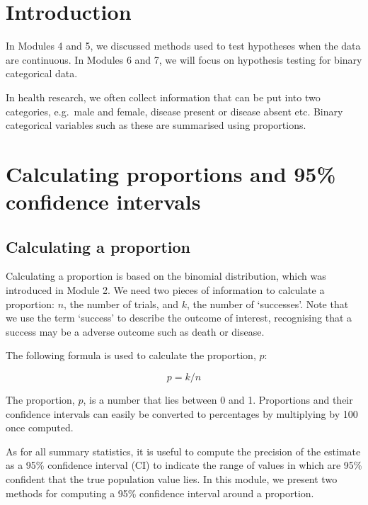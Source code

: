 \documentclass[
]{memoir}
\begin{document}
\hypertarget{introduction-4}{%
\section{Introduction}\label{introduction-4}}

In Modules 4 and 5, we discussed methods used to test hypotheses when the data are continuous. In Modules 6 and 7, we will focus on hypothesis testing for binary categorical data.

In health research, we often collect information that can be put into two categories, e.g.~male and female, disease present or disease absent etc. Binary categorical variables such as these are summarised using proportions.

\hypertarget{calculating-proportions-and-95-confidence-intervals}{%
\section{Calculating proportions and 95\% confidence intervals}\label{calculating-proportions-and-95-confidence-intervals}}

\hypertarget{calculating-a-proportion}{%
\subsection{Calculating a proportion}\label{calculating-a-proportion}}

Calculating a proportion is based on the binomial distribution, which was introduced in Module 2. We need two pieces of information to calculate a proportion: \(n\), the number of trials, and \(k\), the number of `successes'. Note that we use the term `success' to describe the outcome of interest, recognising that a success may be a adverse outcome such as death or disease.

The following formula is used to calculate the proportion, \(p\):

\[ p = k / n \]

The proportion, \(p\), is a number that lies between 0 and 1. Proportions and their confidence intervals can easily be converted to percentages by multiplying by 100 once computed.

As for all summary statistics, it is useful to compute the precision of the estimate as a 95\% confidence interval (CI) to indicate the range of values in which are 95\% confident that the true population value lies. In this module, we present two methods for computing a 95\% confidence interval around a proportion.
\end{document}
